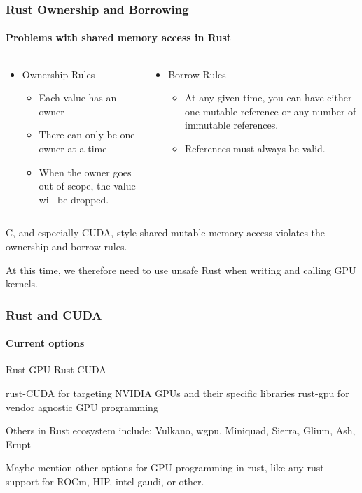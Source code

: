 \documentclass[aspectratio=169]{beamer}
\begin{document}
\begin{frame}
	\frametitle{Rust Ownership and Borrowing}
	\framesubtitle{Problems with shared memory access in Rust}

	\begin{columns}
		\begin{column}{0.5\textwidth}
			\begin{itemize}
				\item Ownership Rules\cite[Ch04-01]{rust-book}
				      \begin{itemize}
					      \item Each value has an owner
					      \item There can only be one owner at a time
					      \item When the owner goes out of scope, the value will be dropped.
				      \end{itemize}
			\end{itemize}
		\end{column}
		\begin{column}{0.5\textwidth}
			\begin{itemize}
				\item Borrow Rules\cite[Ch04-02]{rust-book}
				      \begin{itemize}
					      \item At any given time, you can have either one mutable reference or any number of immutable references.
					      \item References must always be valid.
				      \end{itemize}
			\end{itemize}
		\end{column}
	\end{columns}

	\vspace{1cm}
	C, and especially CUDA, style shared mutable memory access violates the ownership and borrow rules.

	At this time, we therefore need to use unsafe Rust when writing and calling GPU kernels.
\end{frame}

\begin{frame}
	\frametitle{Rust and CUDA}
	\framesubtitle{Current options}

	\begin{outline}[itemize]
		\1 Rust GPU
		\1 Rust CUDA
	\end{outline}

	rust-CUDA for targeting NVIDIA GPUs and their specific libraries
	rust-gpu for vendor agnostic GPU programming

 	Others in Rust ecosystem include: Vulkano, wgpu, Miniquad, Sierra, Glium, Ash, Erupt

	Maybe mention other options for GPU programming in rust, like any rust support for ROCm, HIP, intel gaudi, or other.
\end{frame}
\end{document}
